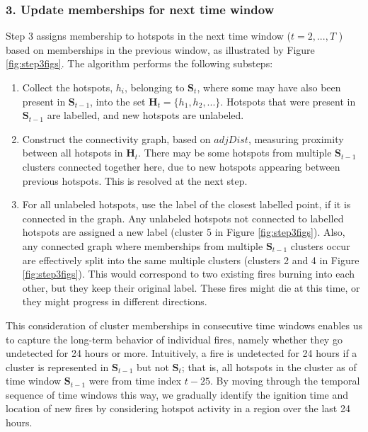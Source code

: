 \hypertarget{update-memberships-for-next-time-window}{%
\subsubsection{3. Update memberships for next time window}\label{update-memberships-for-next-time-window}}

Step 3 assigns membership to hotspots in the next time window (\(t=2, ..., T\) ) based on memberships in the previous window, as illustrated by Figure \ref{fig:step3figs}. The algorithm performs the following substeps:

\begin{enumerate}
\def\labelenumi{(\alph{enumi})}
\item
  Collect the hotspots, \(h_i\), belonging to \(\boldsymbol{S}_{t}\), where some may have also been present in \(\boldsymbol{S}_{t-1}\), into the set \(\boldsymbol{H}_t = \{h_1,h_2,...\}\). Hotspots that were present in \(\boldsymbol{S}_{t-1}\) are labelled, and new hotspots are unlabeled.
\item
  Construct the connectivity graph, based on \(adjDist\), measuring proximity between all hotspots in \(\boldsymbol{H}_t\). There may be some hotspots from multiple \(\boldsymbol{S}_{t-1}\) clusters connected together here, due to new hotspots appearing between previous hotspots. This is resolved at the next step.
\item
  For all unlabeled hotspots, use the label of the closest labelled point, if it is connected in the graph. Any unlabeled hotspots not connected to labelled hotspots are assigned a new label (cluster 5 in Figure \ref{fig:step3figs}). Also, any connected graph where memberships from multiple \(\boldsymbol{S}_{t-1}\) clusters occur are effectively split into the same multiple clusters (clusters 2 and 4 in Figure \ref{fig:step3figs}). This would correspond to two existing fires burning into each other, but they keep their original label. These fires might die at this time, or they might progress in different directions.
\end{enumerate}

This consideration of cluster memberships in consecutive time windows enables us to capture the long-term behavior of individual fires, namely whether they go undetected for 24 hours or more. Intuitively, a fire is undetected for 24 hours if a cluster is represented in \(\boldsymbol{S}_{t-1}\) but not \(\boldsymbol{S}_{t}\); that is, all hotspots in the cluster as of time window \(\boldsymbol{S}_{t-1}\) were from time index \(t-25\). By moving through the temporal sequence of time windows this way, we gradually identify the ignition time and location of new fires by considering hotspot activity in a region over the last 24 hours.

